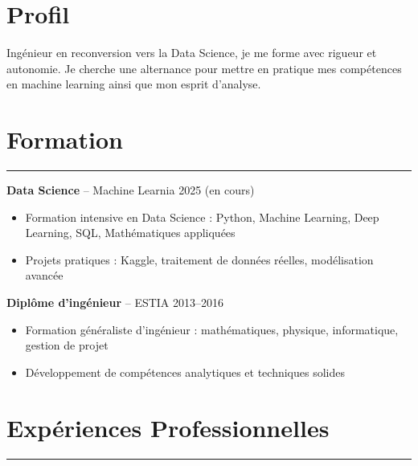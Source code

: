 \documentclass[a4paper,12pt]{article}
\newcommand{\sectionrule}[1]{%
  \section*{#1}%
  \vspace{-1em}%
  {\color{bleufonce}\noindent\rule{\linewidth}{1pt}}%
  \vspace{0.5em}%
}
\begin{document}
\begin{paracol}{2}
\begin{rightcolumn}
\begin{minipage}[t][\dimexpr\textheight - 9em\relax][t]{\dimexpr\linewidth - 1.5em\relax}
{  \section*{Profil}
  Ingénieur en reconversion vers la Data Science, je me forme avec rigueur et autonomie.
  Je cherche une alternance pour mettre en pratique mes compétences en machine learning ainsi que mon esprit d’analyse.

  \vspace{0.7em}

\sectionrule{Formation}
\textbf{Data Science} – Machine Learnia \hfill {\color{blue}2025 (en cours)}
\begin{itemize}[leftmargin=1em, nosep]
  \vspace{0.2em}
  \item Formation intensive en Data Science : Python, Machine Learning, Deep Learning, SQL, Mathématiques appliquées
  \vspace{0.2em}
  \item Projets pratiques : Kaggle, traitement de données réelles, modélisation avancée
\end{itemize}

\vspace{0.5em}
\textbf{Diplôme d'ingénieur} – ESTIA \hfill {\color{blue}2013–2016}
\begin{itemize}[leftmargin=1em, nosep]
  \vspace{0.2em}
  \item Formation généraliste d’ingénieur : mathématiques, physique, informatique, gestion de projet
  \vspace{0.2em}
  \item Développement de compétences analytiques et techniques solides
\end{itemize}

\vspace{0.7em}
\sectionrule{Expériences Professionnelles}

}
\end{minipage}
\end{rightcolumn}
\end{paracol}
\end{document}
